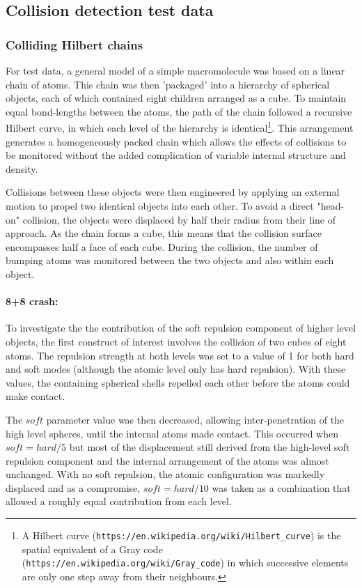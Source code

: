 \subsection{Collision detection test data}

\subsubsection{Colliding Hilbert chains}

For test data,
a general model of a simple macromolecule was based on a linear chain of atoms.
This chain was then 'packaged' into a hierarchy of spherical objects, each of which contained
eight children arranged as a cube.   To maintain equal bond-lengths between the atoms, the path of the
chain followed a recursive Hilbert curve, in which each level of the hierarchy is identical\footnote{
A Hilbert curve ({\tt https://en.wikipedia.org/wiki/Hilbert\_curve}) is the spatial equivalent of a 
Gray code ({\tt https://en.wikipedia.org/wiki/Gray\_code}) in which successive elements are
only one step away from their neighbours.
}.   This arrangement generates a homogeneously packed chain which allows the effects of
collisions to be monitored without the added complication of variable internal structure and density.

Collisions between these objects were then engineered by applying an external
motion to propel two identical objects into each other.   To avoid a direct "head-on"
collision, the objects were displaced by half their radius from their line of approach.
As the chain forms a cube, this means that the collision surface encompasses half a face of each cube.
During the collision, the number of bumping atoms was monitored between the two objects
and also within each object.

\paragraph{8+8 crash:\\}

To investigate the the contribution of the soft repulsion component of higher level objects,
the first construct of interest involves the collision of two cubes of eight atoms.  The
repulsion strength at both levels was set to a value of 1 for both hard and soft modes
(although the atomic level only has hard repulsion).   With these values, the containing
spherical shells repelled each other before the atoms could make contact.

The $soft$ parameter value was then decreased, allowing inter-penetration of the high
level spheres,  until the internal atoms made contact.   This occurred when $soft = hard/5$
but most of the displacement still derived from the high-level soft repulsion component
and the internal arrangement of the atoms was almost unchanged.   With no soft repulsion,
the atomic configuration was markedly displaced and as a compromise, $soft = hard/10$
was taken as a combination that allowed a roughly equal contribution from each level.


